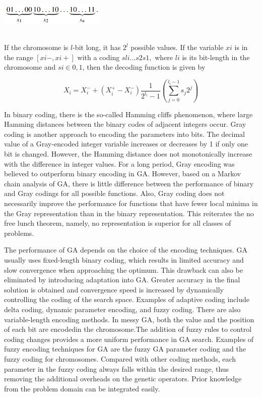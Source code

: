 \documentclass[14pt]{article}
\numberwithin{equation}{subsection}
\begin{document}
		\begin{center}
				\includegraphics[width=5cm, height=2cm]{encoding-decoding_1.PNG}
		\end{center}
		
		If the chromosome is $l$-bit long, it has $2^l$ possible values. If the variable $xi$ is in the range 
		$[xi−, xi+]$ with	a coding $sli . . . s2s1,$ where $li$ is its bit-length in the chromosome and $si ∈ {0, 1}$, 
		then the decoding function is given by
		
		\[X_i = X_i^- + (X_i^+ - X_i^-)\frac{1}{2^{l_i}-1}(\sum_{j=0}^{l_i-1}{s_j 2^j})\]
		
		In binary coding, there is the so-called Hamming cliffs phenomenon, where large Hamming distances between the
		binary codes of adjacent integers occur. Gray coding is another approach to encoding the parameters into bits.
		The decimal value of a Gray-encoded integer variable increases or decreases by 1 if only one bit is changed.
		However, the Hamming distance does not monotonically increase with the difference in integer values. For a long
		period, Gray encoding was believed to outperform binary encoding in GA. However, based on a Markov chain
		analysis of GA, there is little difference between the performance of binary and Gray codings for all possible
		functions. Also, Gray coding does not necessarily improve the performance for functions that
		have fewer local minima in the Gray representation than in the binary representation. This reiterates the no
		free lunch theorem, namely, no representation is superior for all classes of problems.\par
		
		The performance of GA depends on the choice of the encoding techniques. GA usually uses fixed-length binary
		coding, which results in limited accuracy and slow convergence when approaching the optimum. This drawback can
		also be eliminated by introducing adaptation into GA. Greater accuracy in the final solution is obtained and
		convergence speed is increased by dynamically controlling the coding of the search space. Examples of adaptive
		coding include delta coding, dynamic parameter encoding, and fuzzy coding. There are also
		variable-length encoding methods. In messy GA, both the value and the position of each bit are
		encodedin the chromosome.The addition of fuzzy rules to control coding changes provides a more uniform
		performance in GA search. Examples of fuzzy encoding techniques for GA are the fuzzy GA parameter coding
		and the fuzzy coding for chromosomes. Compared with other coding methods, each parameter in the fuzzy
		coding always falls within the desired range, thus removing the additional overheads on the genetic
		operators. Prior knowledge from the problem domain can be integrated easily.
		
\end{document}
